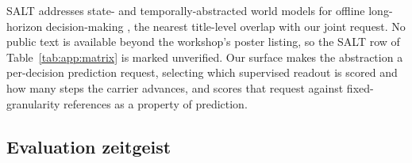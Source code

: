 SALT addresses state- and temporally-abstracted world models for offline long-horizon decision-making \citep{huang2026salt}, the nearest title-level overlap with our joint request. No public text is available beyond the workshop's poster listing, so the SALT row of Table~\ref{tab:app:matrix} is marked unverified. Our surface makes the abstraction a per-decision prediction request, selecting which supervised readout is scored and how many steps the carrier advances, and scores that request against fixed-granularity references as a property of prediction.

\subsection{Evaluation zeitgeist}
\label{sec:app:rel:eval}


